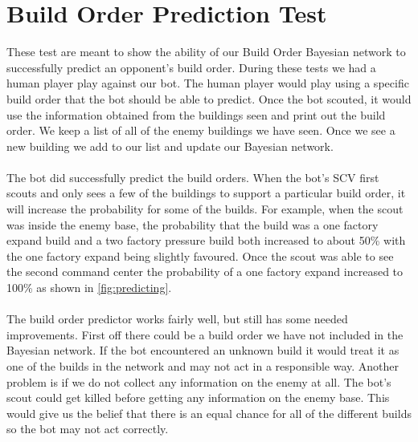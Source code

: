 \section{Build Order Prediction Test}
These test are meant to show the ability of our Build Order Bayesian network to successfully predict an opponent's build order.
During these tests we had a human player play against our bot. The human player would play using a specific build order that the bot should be able to predict. Once the bot scouted, it would use the information obtained from the buildings seen and print out the build order. We keep a list of all of the enemy buildings we have seen. Once we see a new building we add to our list and update our Bayesian network.\\
\\
The bot did successfully predict the build orders. When the bot's SCV first scouts and only sees a few of the buildings to support a particular build order, it will increase the probability for some of the builds. For example, when the scout was inside the enemy base, the probability that the build was a one factory expand build and a two factory pressure build both increased to about 50\% with the one factory expand being slightly favoured. Once the scout was able to see the second command center the probability of a one factory expand increased to 100\% as shown in \ref{fig:predicting}. 
\\
\\
The build order predictor works fairly well, but still has some needed improvements. First off there could be a build order we have not included in the Bayesian network. If the bot encountered an unknown build it would treat it as one of the builds in the network and may not act in a responsible way. Another problem is if we do not collect any information on the enemy at all. The bot's scout could get killed before getting any information on the enemy base. This would give us the belief that there is an equal chance for all of the different builds so the bot may not act correctly.

